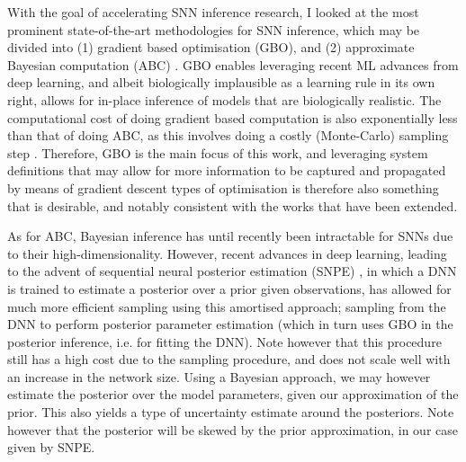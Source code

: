 \documentclass[mphil,deptreport,ianc]{infthesis} %
\begin{document}
With the goal of accelerating SNN inference research, I looked at the most prominent state-of-the-art methodologies for SNN inference, which may be divided into (1) gradient based optimisation (GBO), and (2) approximate Bayesian computation (ABC) \cite{Lueckmann2018, Rene2020, Cranmer2020a, Lueckmann2021}.
GBO enables leveraging recent ML advances from deep learning, and albeit biologically implausible as a learning rule in its own right, allows for in-place inference of models that are biologically realistic. The computational cost of doing gradient based computation is also exponentially less than that of doing ABC, as this involves doing a costly (Monte-Carlo) sampling step \cite{Rene2020}.
Therefore, GBO is the main focus of this work, and leveraging system definitions that may allow for more information to be captured and propagated by means of gradient descent types of optimisation is therefore also something that is desirable, and notably consistent with the works that have been extended.

As for ABC, Bayesian inference has until recently been intractable for SNNs due to their high-dimensionality. However, recent advances in deep learning, leading to the advent of sequential neural posterior estimation (SNPE) \cite{Greenberg2019a, Durkan2018, Goncalves2019, Cranmer2020a}, in which a DNN is trained to estimate a posterior over a prior given observations, has allowed for much more efficient sampling using this amortised approach; sampling from the DNN to perform posterior parameter estimation (which in turn uses GBO in the posterior inference, i.e. for fitting the DNN).
Note however that this procedure still has a high cost due to the sampling procedure, and does not scale well with an increase in the network size.
Using a Bayesian approach, we may however estimate the posterior over the model parameters, given our approximation of the prior. This also yields a type of uncertainty estimate around the posteriors. Note however that the posterior will be skewed by the prior approximation, in our case given by SNPE.
 
\end{document}
